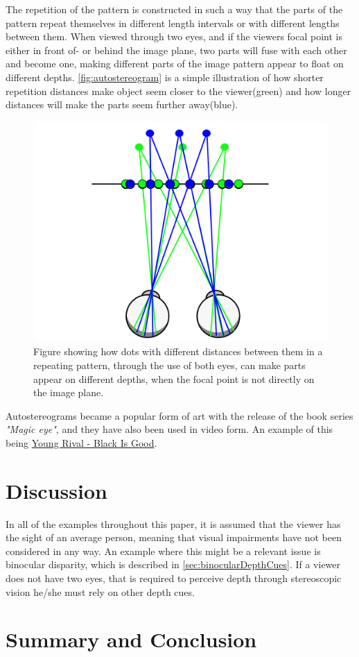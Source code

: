 The repetition of the pattern is constructed in such a way that the parts of the pattern repeat themselves in different length intervals or with different lengths between them. When viewed through two eyes, and if the viewers focal point is either in front of- or behind the image plane, two parts will fuse with each other and become one, making different parts of the image pattern appear to float on different depths\citep{autostereogramNguyen}. \autoref{fig:autostereogram} is a simple illustration of how shorter repetition distances make object seem closer to the viewer(green) and how longer distances will make the parts seem further away(blue). 

\begin{figure}[H]
	\centering
	\includegraphics[width=0.8\linewidth]{figure/Analysis/autoStereogram.png}
	\caption{Figure showing how dots with different distances between them in a repeating pattern, through the use of both eyes, can make parts appear on different depths, when the focal point is not directly on the image plane.}
	\label{fig:autostereogram}
\end{figure}

Autostereograms became a popular form of art with the release of the book series \textit{"Magic eye"}\citep{autostereograms}, and they have also been used in video form. An example of this being \href{https://www.youtube.com/watch?v=2AKtp3XHn38}{\color{blue}Young Rival - Black Is Good}.

\section{Discussion}
In all of the examples throughout this paper, it is assumed that the viewer has the sight of an average person, meaning that visual impairments have not been considered in any way. An example where this might be a relevant issue is binocular disparity, which is described in \autoref{sec:binocularDepthCues}. If a viewer does not have two eyes, that is required to perceive depth through stereoscopic vision he/she must rely on other depth cues.\\


\section{Summary and Conclusion}


